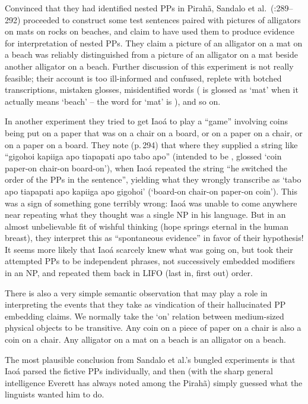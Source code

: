 \documentclass[output=paper,colorlinks,citecolor=brown
]{langscibook}
\begin{document}
Convinced that they had identified nested PPs in Pirah{\~a}, Sandalo
et al.\ (\citeyear{SandaloEtAl18}:289--292) proceeded to construct some
test sentences paired with pictures of alligators on mats on rocks on
beaches, and claim to have used them to produce evidence for
interpretation of nested PPs. They claim a picture of an alligator on
a mat on a beach was reliably distinguished from a picture of an
alligator on a mat beside another alligator on a beach. Further
discussion of this experiment is not really feasible; their account is
too ill-informed and confused, replete with botched transcriptions,
mistaken glosses, misidentified words ( is glossed as
`mat' when it actually means `beach' -- the word for `mat' is
), and so on.

In another experiment they tried to get Iao{\'a} to play a ``game''
involving coins being put on a paper that was on a chair on a board,
or on a paper on a chair, or on a paper on a board. They note (p.\,294)
that where they supplied a string like ``gigohoi kapiiga apo tiapapati
apo tabo apo'' (intended to be , glossed `coin paper-on chair-on board-on'),
when Iao{\'a} repeated the string ``he switched the order of the PPs in
the sentence'', yielding what they wrongly transcribe as `tabo apo
tiapapati apo kapiiga apo gigohoi' (`board-on chair-on paper-on coin').
This was a sign of something gone terribly wrong: Iao{\'a} was unable
to come anywhere near repeating what they thought was a single NP in
his language. But in an almost unbelievable fit of wishful thinking
(hope springs eternal in the human breast), they interpret this as
``spontaneous evidence'' in favor of their hypothesis!
It seems more likely that Iao{\'a} scarcely knew what was going on,
but took their attempted PPs to be independent phrases, not
successively embedded modifiers in an NP, and repeated them back in
LIFO (last in, first out) order.

There is also a very simple semantic observation that may play a
role in interpreting the events that they take as vindication of their
hallucinated PP embedding claims. We normally take the `on' relation
between medium-sized physical objects to be transitive. Any coin on
a piece of paper on a chair is also a coin on a chair. Any alligator
on a mat on a beach is an alligator on a beach.

The most plausible conclusion from Sandalo et al.'s bungled experiments
is that Iao{\'a} parsed the fictive PPs individually, and then (with the
sharp general intelligence Everett has always noted among the Pirah{\~a})
simply guessed what the linguists wanted him to do.
\end{document}
